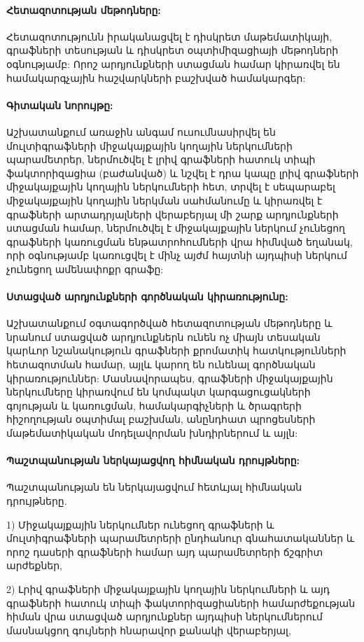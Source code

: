 \paragraph{Հետազոտության մեթոդները:}
Հետազոտությունն իրականացվել է դիսկրետ մաթեմատիկայի, գրաֆների տեսության և դիսկրետ օպտիմիզացիայի մեթոդների օգնությամբ: Որոշ արդյունքների ստացման համար կիրառվել են համակարգչային հաշվարկների բաշխված համակարգեր:


\paragraph{Գիտական նորույթը:}
Աշխատանքում առաջին անգամ ուսումնասիրվել են մուլտիգրաֆների միջակայքային կողային ներկումների պարամետրեր, ներմուծվել է լրիվ գրաֆների հատուկ տիպի ֆակտորիզացիա (բաժանված) և նշվել է դրա կապը լրիվ գրաֆների միջակայքային կողային ներկումների հետ, տրվել է սեպարաբել միջակայքային կողային ներկման սահմանումը և կիրառվել է գրաֆների արտադրյալների վերաբերյալ մի շարք արդյունքների ստացման համար, ներմուծվել է միջակայքային ներկում չունեցող գրաֆների կառուցման ենթատրոհումների վրա հիմնված եղանակ, որի օգնությամբ կառուցվել է մինչ այժմ հայտնի այդպիսի ներկում չունեցող ամենափոքր գրաֆը:


\paragraph{Ստացված արդյունքների գործնական կիրառությունը:}
Աշխատանքում օգտագործված հետազոտության մեթոդները և նրանում ստացված արդյունքներն ունեն ոչ միայն տեսական կարևոր նշանակություն գրաֆների քրոմատիկ հատկությունների հետազոտման համար, այլև կարող են ունենալ գործնական կիրառություններ: Մասնավորապես, գրաֆների միջակայքային ներկումները կիրառվում են կոմպակտ կարգացուցակների գոյության և կառուցման, համակարգիչների և ծրագրերի հիշողության օպտիմալ բաշխման, անընդհատ պրոցեսների մաթեմատիկական մոդելավորման խնդիրներում և այլն: 



\paragraph{Պաշտպանության ներկայացվող հիմնական դրույթները:}
Պաշտպանության են ներկայացվում հետևյալ հիմնական դրույթները.

1) Միջակայքային ներկումներ ունեցող գրաֆների և մուլտիգրաֆների պարամետրերի ընդհանուր գնահատականներ և որոշ դասերի գրաֆների համար այդ պարամետրերի ճշգրիտ արժեքներ,

2) Լրիվ գրաֆների միջակայքային կողային ներկումների և այդ գրաֆների հատուկ տիպի ֆակտորիզացիաների համարժեքության հիման վրա ստացված արդյունքներ այդպիսի ներկումներում մասնակցող գույների հնարավոր քանակի վերաբերյալ,

